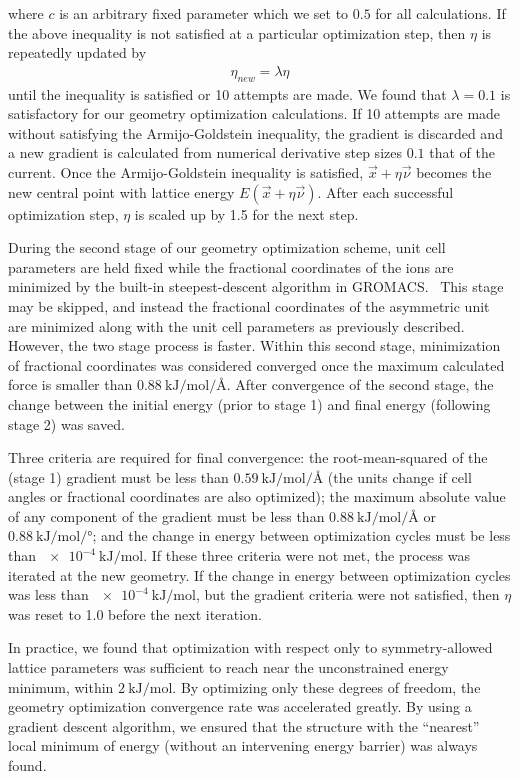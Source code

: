 \documentclass[aip,preprint,amsmath,amssymb,hidelinks]{revtex4-1}
\begin{document}
	where $c$ is an arbitrary fixed parameter which we set to $0.5$ for all calculations. If the above inequality is not satisfied at a particular optimization step, then $\eta$ is repeatedly updated by
	\begin{align}
	\eta_{new} = \lambda \eta
	\end{align}
	until the inequality is satisfied or 10 attempts are made. We found that $\lambda = 0.1$ is satisfactory for our geometry optimization calculations. If 10 attempts are made without satisfying the Armijo-Goldstein inequality, the gradient is discarded and a new gradient is calculated from numerical derivative step sizes $0.1$ that of the current. Once the Armijo-Goldstein inequality is satisfied, $\vec{x} + \eta \vec{\nu}$ becomes the new central point with lattice energy $E(\vec{x} + \eta \vec{\nu})$. After each successful optimization step, $\eta$ is scaled up by 1.5 for the next step.
	
	During the second stage of our geometry optimization scheme, unit cell parameters are held fixed while the fractional coordinates of the ions are minimized by the built-in steepest-descent algorithm in GROMACS.~\cite{gromacs2018manual} This stage may be skipped, and instead the fractional coordinates of the asymmetric unit are minimized along with the unit cell parameters as previously described. However, the two stage process is faster. Within this second stage, minimization of fractional coordinates was considered converged once the maximum calculated force is smaller than $\SI{0.88}{\kilo\joule\per\mole\per\angstrom}$. After convergence of the second stage, the change between the initial energy (prior to stage 1) and final energy (following stage 2) was saved. 
	
	Three criteria are required for final convergence: the root-mean-squared of the (stage 1) gradient must be less than $\SI{0.59}{\kilo\joule\per\mole\per\angstrom}$ (the units change if cell angles or fractional coordinates are also optimized); the maximum absolute value of any component of the gradient must be less than $\SI{0.88}{\kilo\joule\per\mole\per\angstrom}$ or $\SI{0.88}{\kilo\joule\per\mole\per\degree}$; and the change in energy between optimization cycles must be less than $\SI{e-4}{\kilo\joule\per\mole}$. If these three criteria were not met, the process was iterated at the new geometry. If the change in energy between optimization cycles was less than $\SI{e-4}{\kilo\joule\per\mole}$, but the gradient criteria were not satisfied, then $\eta$ was reset to 1.0 before the next iteration.
	
	In practice, we found that optimization with respect only to symmetry-allowed lattice parameters was sufficient to reach near the unconstrained energy minimum, within $\SI{2}{\kilo\joule\per\mole}$. By optimizing only these degrees of freedom, the geometry optimization convergence rate was accelerated greatly. By using a gradient descent algorithm, we ensured that the structure with the ``nearest'' local minimum of energy (without an intervening energy barrier) was always found.
	
\end{document}
